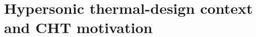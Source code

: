 \section{Hypersonic thermal-design context and CHT motivation}
\label{sec:introduction:hypersonic-thermal-design-cht}
